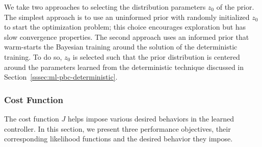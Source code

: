 We take two approaches to selecting the distribution parameters $z_0$ of the
prior. The simplest approach is to use an uninformed prior with randomly
initialized $z_0$ to start the optimization problem; this choice encourages
exploration but has slow convergence properties. The second approach uses an
informed prior that warm-starts the Bayesian training around the solution of the
deterministic training. To do so, $z_0$ is selected such that the prior
distribution is centered around the parameters learned from the deterministic
technique discussed in Section~\ref{sssec:ml-pbc-deterministic}.


\subsubsection{Cost Function}
\label{sssec:cost}

The cost function $J$ helps impose various desired behaviors in the learned
controller. In this section, we present three performance objectives, their
corresponding likelihood functions and the desired behavior they impose.

